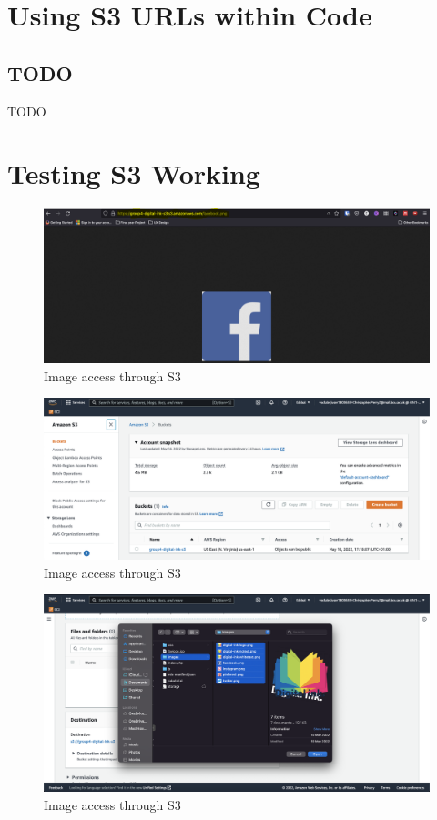 \section{Using S3 URLs within Code}

\subsection{TODO}

TODO

\section{Testing S3 Working}

\begin{figure}
    \centering
    \includegraphics[width=\textwidth]{resources/s3/s3-image-displayed.png}
    \caption{Image access through S3}
    \label{fig:s3-image}
\end{figure}

\begin{figure}
    \centering
    \includegraphics[width=\textwidth]{resources/s3/s3-created.png}
    \caption{Image access through S3}
    \label{fig:s3-created}
\end{figure}

\begin{figure}
    \centering
    \includegraphics[width=\textwidth]{resources/s3/s3-image-upload.png}
    \caption{Image access through S3}
    \label{fig:s3-image-upload}
\end{figure}


